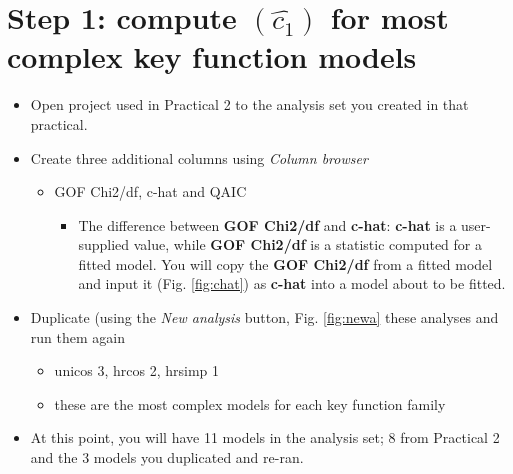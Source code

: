 \documentclass[a4paper, 10pt]{article}
\begin{document}
\section{Step 1: compute $(\hat{c_1})$ for most complex key function models}

\begin{itemize}
	\item Open project used in Practical 2 to the analysis set you created in that practical.
	\item Create three additional columns using \emph{Column browser}
	\begin{itemize}
		\item GOF Chi2/df, c-hat and QAIC
		\begin{itemize}
			\item The difference between \textbf{GOF Chi2/df} and \textbf{c-hat}: \textbf{c-hat} is a user-supplied value, while \textbf{GOF Chi2/df} is a statistic computed for a fitted model.  You will copy the \textbf{GOF Chi2/df} from a fitted model and input it (Fig. \ref{fig:chat}) as \textbf{c-hat} into a model about to be fitted.
		\end{itemize}
	\end{itemize}
	\item Duplicate (using the \emph{New analysis} button, Fig. \ref{fig:newa} these analyses and run them again
		\begin{itemize}
			\item unicos 3, hrcos 2, hrsimp 1
			\item these are the most complex models for each key function family
		\end{itemize}
	\item At this point, you will have 11 models in the analysis set; 8 from Practical 2 and the 3 models you duplicated and re-ran.
\end{itemize}

{
}
\end{document}
